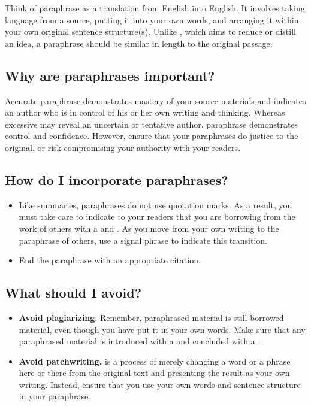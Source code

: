 Think of paraphrase as a translation from English into English. It involves
taking
language from a source, putting it into your own words, and arranging it within
your own original
sentence structure(s). Unlike \hyperlink{summary}{\color{Ahrenge}{summary}}, which aims to reduce or distill an
idea, a paraphrase should
be similar in length to the original passage.

\subsection{Why are paraphrases important?}

Accurate paraphrase demonstrates mastery of your source materials and
indicates an author who is in control of his or her own writing and thinking. Whereas excessive
\hyperlink{quotation}{\color{Ahrenge}{quotation}} may reveal an uncertain or tentative author, paraphrase demonstrates control and
confidence. However, ensure that your paraphrases do justice to the original, or risk compromising
your authority with your readers.

\subsection{How do I incorporate paraphrases?}

\begin{itemize}
\item Like summaries, paraphrases do not use quotation marks. As a result,
you must take care to indicate to your readers that you are borrowing from
the work of others with a \hyperlink{signalphrase}{\color{Ahrenge}{signal phrase}} and \hyperlink{citation}{\color{Ahrenge}{citation}}. As you move
from your own writing to the paraphrase of others, use a signal phrase to
indicate this transition.

\item End the paraphrase with an appropriate citation.

\end{itemize}

\subsection {What should I avoid?}

\begin{itemize}

\item \textbf{Avoid plagiarizing}. Remember, paraphrased material
is still borrowed material, even though you have put it in your own words. Make sure that any paraphrased material is introduced with a \hyperlink{signalphrase}{\color{Ahrenge}{signal phrase}} and concluded with a \hyperlink{citation}{\color{Ahrenge}{citation}}.

\item \textbf{Avoid patchwriting.} \hyperlink{patchwriting}{\color{Ahrenge}{Patchwriting}} is a process of merely changing a word or a phrase here or there from the original text and presenting the result as your own writing. Instead, ensure that you use your own words and sentence structure in your paraphrase.
\end{itemize}

